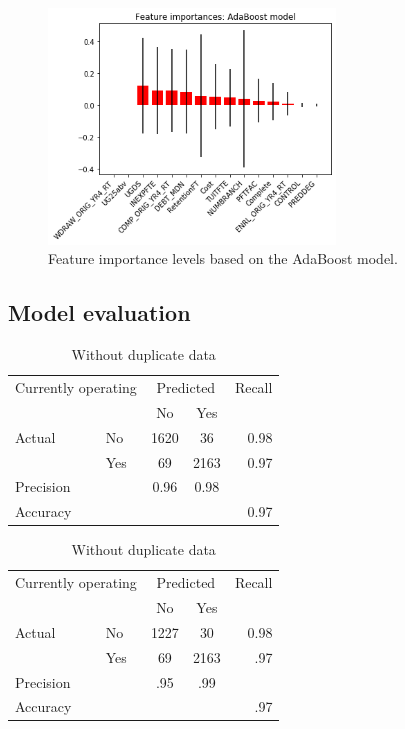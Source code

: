 \documentclass[11pt, letterpaper]{article}
\begin{document}
\begin{figure}[h]
\begin{center}
\includegraphics[width=3in]{ABFeatureImportance.png}
\caption{Feature importance levels based on the AdaBoost model.} 
\label{fig:Features}
\end{center}
\end{figure}

\newpage
\subsection{Model evaluation}

\begin{table}[h!]
 	\caption{AdaBoost model - Confusion matrices and Evaluation metrics} 
 	\begin{minipage}{.5\linewidth}
		\caption{Resampled data}
		\centering
		\begin{tabular}{l l | c c r }
\multicolumn{2}{l}{Currently operating} & \multicolumn{2}{c}{Predicted} & Recall \\
& & No & Yes &  \\ 
\cline{2-5}
Actual & No & 1620 &  36 & 0.98 \\
& Yes & 69 & 2163 & 0.97 \\  \hline
Precision&  & 0.96 & 0.98 \\ 
Accuracy & & &  & 0.97 \\
	\end{tabular}
	\label{tab:ABConfusionResamp}
	\end{minipage}%
	\begin{minipage}{.5\linewidth}
	\caption{Without duplicate data}
	\centering
		\begin{tabular}{l l | c c r }
\multicolumn{2}{l}{Currently operating} & \multicolumn{2}{c}{Predicted} & Recall \\
& & No & Yes &  \\ 
\cline{2-5}
Actual & No & 1227 &  30 & 0.98 \\
& Yes & 69 & 2163 & .97 \\  \hline
Precision&  & .95 & .99 \\ 
Accuracy & & &  & .97 \\
	\end{tabular}
	\label{tab:ABConfusionNoDup}	
	\end{minipage}
\end{table} 
\end{document}
